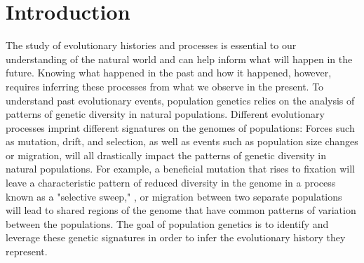 











\chapter{Introduction}

The study of evolutionary histories and processes is essential to our understanding 
of the natural world and can help inform what will happen in the future.
Knowing what happened in the past and how it happened, however, requires inferring 
these processes from what we observe in the present.
To understand past evolutionary events, population genetics relies on the analysis of
patterns of genetic diversity in natural populations.
Different evolutionary processes imprint different signatures on the genomes of populations:
Forces such as mutation, drift, and selection, as well as events such as population size changes or migration, 
will all drastically impact the patterns of genetic diversity in natural populations. 
For example, a beneficial mutation that rises to fixation will leave a characteristic pattern 
of reduced diversity in the genome in a process known as a "selective sweep," \citep{smith_hitch-hiking_1974},
or migration between two separate populations will lead to shared regions
of the genome that have common patterns of variation between the populations.
The goal of population genetics is to identify and leverage these genetic signatures in order to 
infer the evolutionary history they represent.

